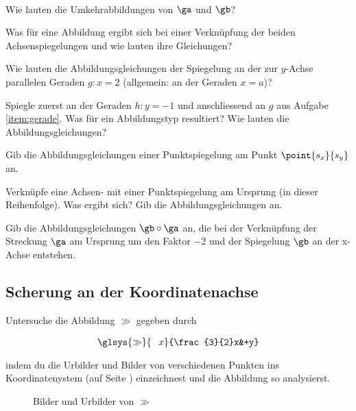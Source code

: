 \documentclass[%
11pt,%
twoside,%
titlepage,%
german,%
headsepline%
]{scrartcl}
\begin{document}
\begin{ueb}
\ \\[-4ex]
\begin{enumeratea}
\item Wie lauten die Umkehrabbildungen von $\ga$ und $\gb$?
\item Was für eine Abbildung ergibt sich bei einer Verknüpfung der beiden Achsenspiegelungen und wie lauten ihre Gleichungen?
\item\label{item:gerade} Wie lauten die Abbildungsgleichungen der Spiegelung an der zur $y$-Achse parallelen Geraden $g: x = 2$ (allgemein: an der Geraden $x = a$)?
\item Spiegle zuerst an der Geraden $h: y = -1$ und anschliessend an $g$ aus Aufgabe \eqref{item:gerade}. Was für ein Abbildungstyp resultiert? Wie lauten die Abbildungsgleichungen?
\item Gib die Abbildungsgleichungen einer Punktspiegelung am Punkt $\point{s_x}{s_y}$ an.
\item Verknüpfe eine Achsen- mit einer Punktspiegelung am Ursprung (in dieser Reihenfolge). Was ergibt sich? Gib die Abbildungsgleichungen an.
\item Gib die Abbildungsgleichungen $\gb\circ\ga$ an, die bei der Verknüpfung der Streckung $\ga$ am Ursprung um den Faktor $-2$ und der Spiegelung $\gb$ an der x-Achse entstehen.
\end{enumeratea}
\end{ueb}

\subsection{Scherung an der Koordinatenachse}
Untersuche die Abbildung $\gg$ gegeben durch
$$\glsys{\gg}{\phantom{\frac{3}{2}}x}{\frac{3}{2}x&+y}$$
indem du die Urbilder und Bilder von verschiedenen Punkten ins Koordinatenystem (auf Seite \pageref{bilderundurbilder}) einzeichnest und die Abbildung so analysierst.

\begin{figure}
\begin{center}
\end{center}
\caption{Bilder und Urbilder von $\gg$}\label{bilderundurbilder}
\end{figure}
\end{document}
